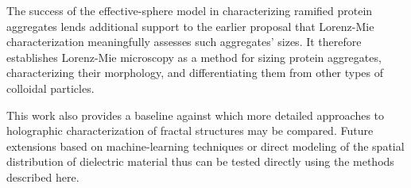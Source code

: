The success of the effective-sphere model in 
characterizing ramified protein aggregates lends
additional support to the earlier proposal \cite{wang16}
that Lorenz-Mie characterization meaningfully assesses
such aggregates' sizes.
It therefore establishes Lorenz-Mie microscopy as a
method for sizing protein aggregates, characterizing
their morphology, and differentiating them from 
other types of colloidal particles.

This work also provides a baseline against which
more detailed approaches to holographic characterization
of fractal structures may be compared.
Future extensions based on machine-learning techniques \cite{yevick14}
or direct modeling of the spatial distribution of 
dielectric material \cite{fung12} thus can be tested directly using
the methods described here.